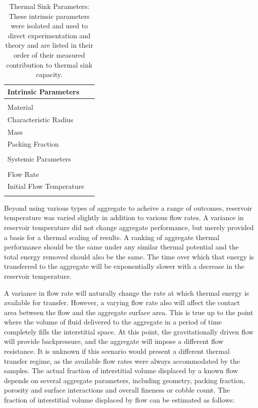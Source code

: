 \begin{table}[t] 
\centering                           
\caption[Thermal Sink Parameters]{Thermal Sink Parameters: These intrinsic parameters were isolated and used to direct experimentation and theory and are listed in their order of their measured contribution to thermal sink capacity.\label{matrix}} 
\begin{tabular}{l l}           
\\[1ex] 
\hline\hline             
Intrinsic Parameters
\\
\hline 
\\
Material\\
Characteristic Radius\\
Mass\\
Packing Fraction\\
\\
\hline\hline
Systemic Parameters\\
\hline
\\
Flow Rate\\
Initial Flow Temperature\\
\\
\hline\hline
\end{tabular}
\label{tab:matrix}
\end{table}

Beyond using various types of aggregate to acheive a range of outcomes, reservoir temperature was varied slightly in addition to various flow rates. A variance in reservoir temperature did not change aggregate performance, but merely provided a basis for a thermal scaling of results. A ranking of aggregate thermal performance should be the same under any similar thermal potential and the total energy removed should also be the same. The time over which that energy is transferred to the aggregate will be exponentially slower with a decrease in the reservoir temperature. 

A variance in flow rate will naturally change the rate at which thermal energy is available for transfer. However, a varying flow rate also will affect the contact area between the flow and the aggregate surface area. This is true up to the point where the volume of fluid delivered to the aggregate in a period of time completely fills the interstitial space. At this point, the gravitationally driven flow will provide backpressure, and the aggregate will impose a different flow resistance. It is unknown if this scenario would present a different thermal transfer regime, as the available flow rates were always accommodated by the samples. The actual fraction of interstitial volume displaced by a known flow depends on several aggregate parameters, including geometry, packing fraction, porosity and surface interactions and overall fineness or cobble count. The fraction of interstitial volume displaced by flow can be estimated as follows:

